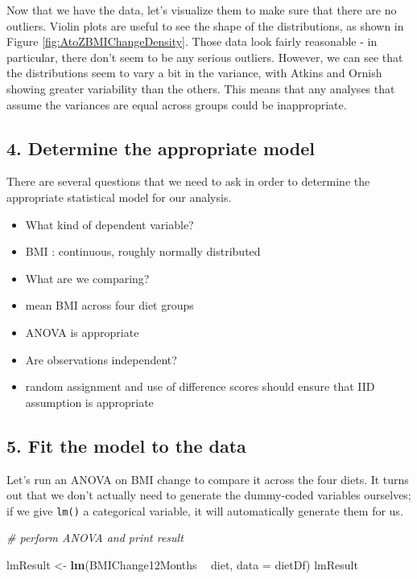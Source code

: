\documentclass[]{book}
\newenvironment{Shaded}{\begin{snugshade}}{\end{snugshade}}
\newcommand{\KeywordTok}[1]{\textcolor[rgb]{0.13,0.29,0.53}{\textbf{#1}}}
\newcommand{\DataTypeTok}[1]{\textcolor[rgb]{0.13,0.29,0.53}{#1}}
\newcommand{\StringTok}[1]{\textcolor[rgb]{0.31,0.60,0.02}{#1}}
\newcommand{\CommentTok}[1]{\textcolor[rgb]{0.56,0.35,0.01}{\textit{#1}}}
\newcommand{\OperatorTok}[1]{\textcolor[rgb]{0.81,0.36,0.00}{\textbf{#1}}}
\newcommand{\NormalTok}[1]{#1}
\providecommand{\tightlist}{%
  \setlength{\itemsep}{0pt}\setlength{\parskip}{0pt}}
\theoremstyle{definition}
\theoremstyle{definition}
\theoremstyle{definition}
\theoremstyle{remark}
\begin{document}
Now that we have the data, let's visualize them to make sure that there
are no outliers. Violin plots are useful to see the shape of the
distributions, as shown in Figure \ref{fig:AtoZBMIChangeDensity}. Those
data look fairly reasonable - in particular, there don't seem to be any
serious outliers. However, we can see that the distributions seem to
vary a bit in the variance, with Atkins and Ornish showing greater
variability than the others. This means that any analyses that assume
the variances are equal across groups could be inappropriate.

\subsection{4. Determine the appropriate
model}\label{determine-the-appropriate-model}

There are several questions that we need to ask in order to determine
the appropriate statistical model for our analysis.

\begin{itemize}
\tightlist
\item
  What kind of dependent variable?
\item
  BMI : continuous, roughly normally distributed
\item
  What are we comparing?
\item
  mean BMI across four diet groups
\item
  ANOVA is appropriate
\item
  Are observations independent?
\item
  random assignment and use of difference scores should ensure that IID
  assumption is appropriate
\end{itemize}

\subsection{5. Fit the model to the
data}\label{fit-the-model-to-the-data}

Let's run an ANOVA on BMI change to compare it across the four diets. It
turns out that we don't actually need to generate the dummy-coded
variables ourselves; if we give \texttt{lm()} a categorical variable, it
will automatically generate them for us.

\begin{Shaded}
\begin{Highlighting}[]
\CommentTok{# perform ANOVA and print result}

\NormalTok{lmResult <-}\StringTok{ }\KeywordTok{lm}\NormalTok{(BMIChange12Months }\OperatorTok{~}\StringTok{ }\NormalTok{diet, }\DataTypeTok{data =}\NormalTok{ dietDf)}
\NormalTok{lmResult}
\end{Highlighting}
\end{Shaded}
\end{document}
